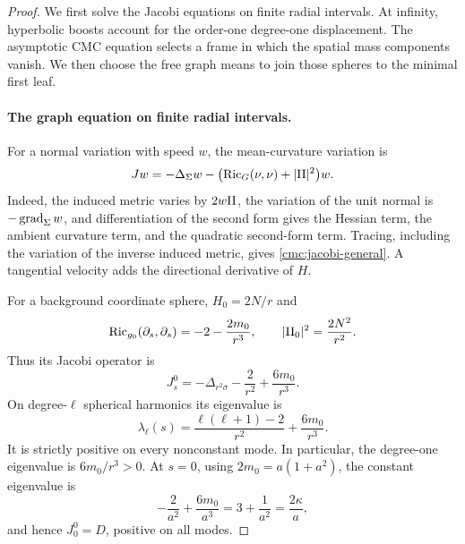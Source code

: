 \begin{proof}
We first solve the Jacobi equations on finite radial intervals.
At infinity, hyperbolic boosts account for the order-one degree-one
displacement. The asymptotic CMC equation selects a frame in which the
spatial mass components vanish. We then choose the free graph means
to join those spheres to the minimal first leaf.

\paragraph{The graph equation on finite radial intervals.}
For a normal variation with speed \(w\), the mean-curvature variation is
\begin{equation}\label{cmc:jacobi-general}
 Jw=-\Delta_{\Sigma}w
 -\bigl(\operatorname{Ric}_G(\nu,\nu)+|\mathrm{II}|^2\bigr)w.
\end{equation}
Indeed, the induced metric varies by \(2w\mathrm{II}\), the variation of the
unit normal is \(-\operatorname{grad}_\Sigma w\), and differentiation of the second
form gives the Hessian term, the ambient curvature term, and the
quadratic second-form term.  Tracing, including the variation of the
inverse induced metric, gives \eqref{cmc:jacobi-general}.  A tangential
velocity adds the directional derivative of \(H\).

For a background coordinate sphere, \(H_0=2N/r\) and
\[
 \operatorname{Ric}_{g_0}(\partial_s,\partial_s)=-2-\frac{2m_0}{r^3},
 \qquad |\mathrm{II}_0|^2=\frac{2N^2}{r^2}.
\]
Thus its Jacobi operator is
\begin{equation}\label{cmc:background-jacobi}
 J_s^0=-\Delta_{r^2\sigma}-\frac2{r^2}+\frac{6m_0}{r^3}.
\end{equation}
On degree-\(\ell\) spherical harmonics its eigenvalue is
\begin{equation}\label{cmc:jacobi-eigenvalues}
 \lambda_\ell(s)
 =\frac{\ell(\ell+1)-2}{r^2}+\frac{6m_0}{r^3}.
\end{equation}
It is strictly positive on every nonconstant mode.  In particular,
the degree-one eigenvalue is \(6m_0/r^3>0\).
At \(s=0\), using \(2m_0=a(1+a^2)\), the constant eigenvalue is
\[
 -\frac2{a^2}+\frac{6m_0}{a^3}
 =3+\frac1{a^2}=\frac{2\kappa}{a},
\]
and hence \(J_0^0=D\), positive on all modes.


\end{proof}
